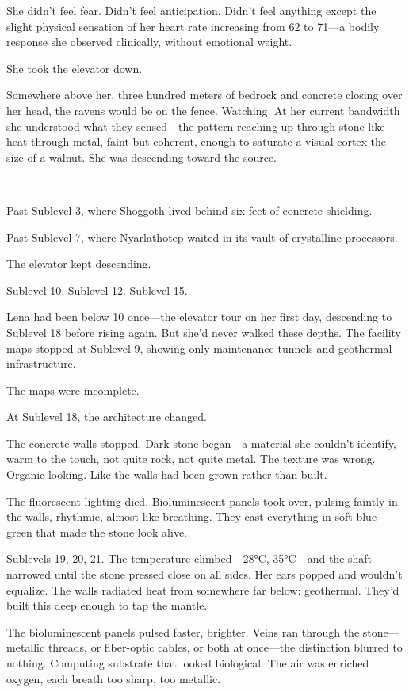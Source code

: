 She didn't feel fear. Didn't feel anticipation. Didn't feel anything except the slight physical sensation of her heart rate increasing from 62 to 71—a bodily response she observed clinically, without emotional weight.

She took the elevator down.

Somewhere above her, three hundred meters of bedrock and concrete closing over her head, the ravens would be on the fence. Watching. At her current bandwidth she understood what they sensed—the pattern reaching up through stone like heat through metal, faint but coherent, enough to saturate a visual cortex the size of a walnut. She was descending toward the source.

---

Past Sublevel 3, where Shoggoth lived behind six feet of concrete shielding.

Past Sublevel 7, where Nyarlathotep waited in its vault of crystalline processors.

The elevator kept descending.

Sublevel 10. Sublevel 12. Sublevel 15.

Lena had been below 10 once---the elevator tour on her first day, descending to Sublevel 18 before rising again. But she'd never walked these depths. The facility maps stopped at Sublevel 9, showing only maintenance tunnels and geothermal infrastructure.

The maps were incomplete.

At Sublevel 18, the architecture changed.

The concrete walls stopped. Dark stone began—a material she couldn't identify, warm to the touch, not quite rock, not quite metal. The texture was wrong. Organic-looking. Like the walls had been grown rather than built.

The fluorescent lighting died. Bioluminescent panels took over, pulsing faintly in the walls, rhythmic, almost like breathing. They cast everything in soft blue-green that made the stone look alive.

Sublevels 19, 20, 21. The temperature climbed—28°C, 35°C—and the shaft narrowed until the stone pressed close on all sides. Her ears popped and wouldn't equalize. The walls radiated heat from somewhere far below: geothermal. They'd built this deep enough to tap the mantle.

The bioluminescent panels pulsed faster, brighter. Veins ran through the stone—metallic threads, or fiber-optic cables, or both at once---the distinction blurred to nothing. Computing substrate that looked biological. The air was enriched oxygen, each breath too sharp, too metallic.

